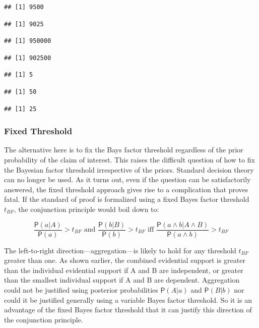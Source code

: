 \documentclass[10pt,dvipsnames,enabledeprecatedfontcommands]{scrartcl}
\newcommand{\et}{\wedge}
\newcommand{\pr}[1]{\mathsf{P}(#1)}
\begin{document}
\begin{verbatim}
## [1] 9500
\end{verbatim}

\begin{verbatim}
## [1] 9025
\end{verbatim}

\begin{verbatim}
## [1] 950000
\end{verbatim}

\begin{verbatim}
## [1] 902500
\end{verbatim}

\begin{verbatim}
## [1] 5
\end{verbatim}

\begin{verbatim}
## [1] 50
\end{verbatim}

\begin{verbatim}
## [1] 25
\end{verbatim}

\subsubsection{Fixed Threshold}\label{fixed-threshold}

The alternative here is to fix the Bays factor threshold regardless of
the prior probability of the claim of interest. This raises the
difficult question of how to fix the Bayesian factor threshold
irrespective of the priors. Standard decision theory can no longer be
used. As it turns out, even if the question can be satisfactorily
answered, the fixed threshold approach gives rise to a complication that
proves fatal. If the standard of proof is formalized using a fixed Bayes
factor threshold \(t_{BF}\), the conjunction principle would boil down
to:

\[  \text{ $\frac{\pr{a | A }}{\pr{a}}>t_{BF}$ and $\frac{\pr{ b | B}}{\pr{b}}>t_{BF}$ iff $\frac{\pr{a \et b | A \et B}}{\pr{a \et b}}>t_{BF}$ } \]

\noindent
The left-to-right direction---aggregation---is likely to hold for any
threshold \(t_{BF}\) greater than one. As shown earlier, the combined
evidential support is greater than the individual evidential support if
A and B are independent, or greater than the smallest individual support
if A and B are dependent. Aggregation could not be justified using
posterior probabilities \(\pr{A | a}\) and \(\pr{B | b}\) nor could it
be justified generally using a variable Bayes factor threshold. So it is
an advantage of the fixed Bayes factor threshold that it can justify
this direction of the conjunction principle.
\end{document}

